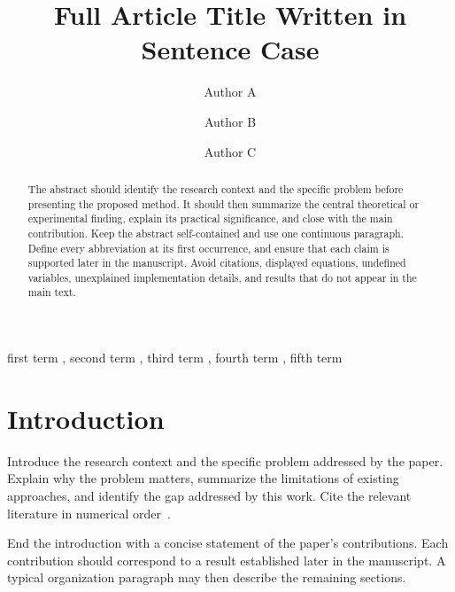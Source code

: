 \documentclass[final,3p,times,twocolumn]{elsarticle}
\begin{document}
\begin{frontmatter}

\title{Full Article Title Written in Sentence Case}

\author[a]{Author A}
\author[b]{Author B}
\author[a]{Author C}




\begin{abstract}
The abstract should identify the research context and the specific problem before presenting the proposed method. It should then summarize the central theoretical or experimental finding, explain its practical significance, and close with the main contribution. Keep the abstract self-contained and use one continuous paragraph. Define every abbreviation at its first occurrence, and ensure that each claim is supported later in the manuscript. Avoid citations, displayed equations, undefined variables, unexplained implementation details, and results that do not appear in the main text.
\end{abstract}

\begin{keyword}
first term \sep
second term \sep
third term \sep
fourth term \sep
fifth term
\end{keyword}

\end{frontmatter}

\section{Introduction}

Introduce the research context and the specific problem addressed by the paper. Explain why the problem matters, summarize the limitations of existing approaches, and identify the gap addressed by this work. Cite the relevant literature in numerical order~\cite{example2026}.

End the introduction with a concise statement of the paper's contributions. Each contribution should correspond to a result established later in the manuscript. A typical organization paragraph may then describe the remaining sections.
\end{document}
